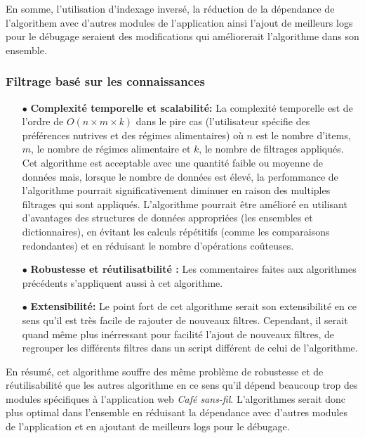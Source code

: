 \documentclass[11pt]{article}
\begin{document}
En somme, l'utilisation d'indexage inversé, la réduction de la dépendance de l'algorithem avec d'autres modules de l'application ainsi l'ajout de meilleurs logs pour le débugage seraient des modifications qui améliorerait l'algorithme dans son ensemble.

\subsubsection{Filtrage basé sur les connaissances}

\begin{itemize}
	\item[$\bullet$] \textbf{Complexité temporelle et scalabilité:} La complexité temporelle est de l'ordre de $O(n \times m \times k)$ dans le pire cas (l'utilisateur spécifie des préférences nutrives et des régimes alimentaires) où $n$ est le nombre d'items, $m$, le nombre de régimes alimentaire et $k$, le nombre de filtrages appliqués. Cet algorithme est acceptable avec une quantité faible ou moyenne de données mais, lorsque le nombre de données est élevé, la perfommance de l'algorithme pourrait significativement diminuer en raison des multiples filtrages qui sont appliqués. L'algorithme pourrait être amélioré en utilisant d'avantages des structures de données appropriées (les ensembles et dictionnaires), en évitant les calculs répétitifs (comme les comparaisons redondantes) et en réduisant le nombre d'opérations coûteuses.\\
		
	\item[$\bullet$] \textbf{Robustesse et réutilisatbilité :} Les commentaires faites aux algorithmes précédents s'appliquent aussi à cet algorithme.\\
	
	\item[$\bullet$] \textbf{Extensibilité:} Le point fort de cet algorithme serait son extensibilité en ce sens qu'il est très facile de rajouter de nouveaux filtres. Cependant, il serait quand même plus inérressant pour facilité l'ajout de nouveaux filtres, de regrouper les différents filtres dans un script différent de celui de l'algorithme.\\
	
\end{itemize}

En résumé, cet algorithme souffre des même problème de robustesse et de réutilisabilité que les autres algorithme en ce sens qu'il dépend beaucoup trop des modules spécifiques à l'application web \textit{Café sans-fil}. L'algorithmes serait donc plus optimal dans l'ensemble en réduisant la dépendance avec d'autres modules de l'application et en ajoutant de meilleurs logs pour le débugage.
\end{document}
